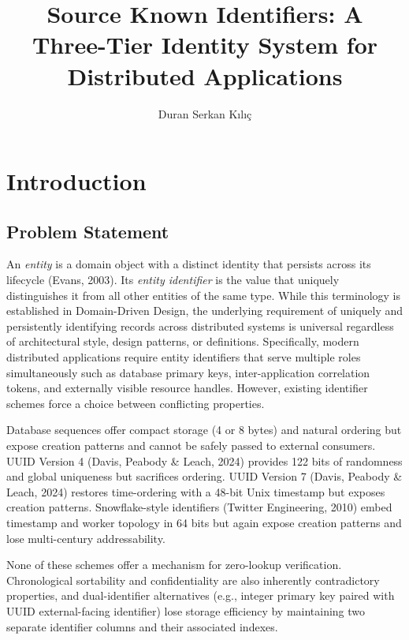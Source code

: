 \documentclass[fleqn,10pt,lineno]{wlpeerj}
\title{Source Known Identifiers: A Three-Tier Identity System for
Distributed Applications}
\author[1]{Duran Serkan Kılıç}
\affil[1]{Independent Researcher, Ankara, Türkiye}
\begin{document}
\flushbottom
\maketitle
\thispagestyle{empty}

\newpage

\section{Introduction}\label{introduction}

\subsection{Problem Statement}\label{problem-statement}

An \emph{entity} is a domain object with a distinct identity that
persists across its lifecycle (Evans, 2003). Its \emph{entity
identifier} is the value that uniquely distinguishes it from all other
entities of the same type. While this terminology is established in
Domain-Driven Design, the underlying requirement of uniquely and
persistently identifying records across distributed systems is universal
regardless of architectural style, design patterns, or definitions.
Specifically, modern distributed applications require entity identifiers
that serve multiple roles simultaneously such as database primary keys,
inter-application correlation tokens, and externally visible resource
handles. However, existing identifier schemes force a choice between
conflicting properties.

Database sequences offer compact storage (4 or 8 bytes) and natural
ordering but expose creation patterns and cannot be safely passed to
external consumers. UUID Version 4 (Davis, Peabody \& Leach, 2024)
provides 122 bits of randomness and global uniqueness but sacrifices
ordering. UUID Version 7 (Davis, Peabody \& Leach, 2024) restores
time-ordering with a 48-bit Unix timestamp but exposes creation
patterns. Snowflake-style identifiers (Twitter Engineering, 2010) embed
timestamp and worker topology in 64 bits but again expose creation
patterns and lose multi-century addressability.

None of these schemes offer a mechanism for zero-lookup verification.
Chronological sortability and confidentiality are also inherently
contradictory properties, and dual-identifier alternatives (e.g.,
integer primary key paired with UUID external-facing identifier) lose
storage efficiency by maintaining two separate identifier columns and
their associated indexes.
\end{document}
